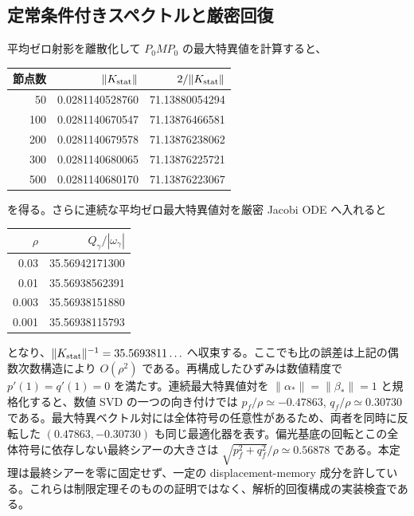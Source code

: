 \subsection{定常条件付きスペクトルと厳密回復}
平均ゼロ射影を離散化して $P_0MP_0$ の最大特異値を計算すると、
\begin{center}
\begin{tabular}{rrr}
\toprule
節点数&$\|K_{\rm stat}\|$&$2/\|K_{\rm stat}\|$\\
\midrule
50&0.0281140528760&71.13880054294\\
100&0.0281140670547&71.13876466581\\
200&0.0281140679578&71.13876238062\\
300&0.0281140680065&71.13876225721\\
500&0.0281140680170&71.13876223067\\
\bottomrule
\end{tabular}
\end{center}
を得る。さらに連続な平均ゼロ最大特異値対を厳密 Jacobi ODE へ入れると
\begin{center}
\begin{tabular}{rr}
\toprule
$\rho$ & $Q_\gamma/|\omega_\gamma|$\\
\midrule
0.03&35.56942171300\\
0.01&35.56938562391\\
0.003&35.56938151880\\
0.001&35.56938115793\\
\bottomrule
\end{tabular}
\end{center}
となり、$\|K_{\rm stat}\|^{-1}=35.5693811\ldots$ へ収束する。ここでも比の誤差は上記の偶数次数構造により $O(\rho^2)$ である。再構成したひずみは数値精度で $p'(1)=q'(1)=0$ を満たす。連続最大特異値対を $\|\alpha_*\|=\|\beta_*\|=1$ と規格化すると、数値 SVD の一つの向き付けでは $p_f/\rho\simeq-0.47863$, $q_f/\rho\simeq0.30730$ である。最大特異ベクトル対には全体符号の任意性があるため、両者を同時に反転した $(0.47863,-0.30730)$ も同じ最適化器を表す。偏光基底の回転とこの全体符号に依存しない最終シアーの大きさは $\sqrt{p_f^2+q_f^2}/\rho\simeq0.56878$ である。本定理は最終シアーを零に固定せず、一定の displacement-memory 成分を許している。これらは制限定理そのものの証明ではなく、解析的回復構成の実装検査である。


